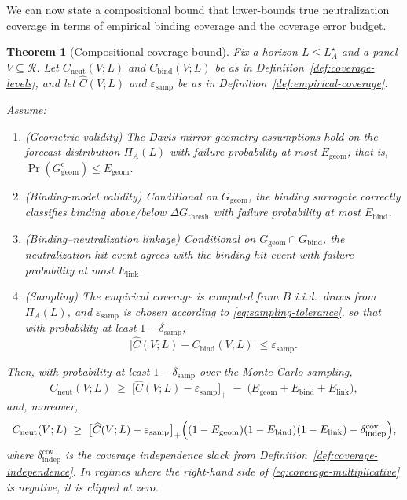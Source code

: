 \documentclass[11pt]{article}
\newtheorem{theorem}{Theorem}
\begin{document}
We can now state a compositional bound that lower-bounds true neutralization coverage in terms
of empirical binding coverage and the coverage error budget.

\begin{theorem}[Compositional coverage bound]
\label{thm:coverage-bound}
Fix a horizon $L \le L_A^\star$ and a panel $V \subseteq \mathcal{R}$. Let
$C_{\mathrm{neut}}(V;L)$ and $C_{\mathrm{bind}}(V;L)$ be as in
Definition~\ref{def:coverage-levels}, and let $\widehat{C}(V;L)$ and
$\varepsilon_{\mathrm{samp}}$ be as in Definition~\ref{def:empirical-coverage}.

Assume:
\begin{enumerate}
\item (\emph{Geometric validity}) The Davis mirror-geometry assumptions hold on the
forecast distribution $\Pi_A(L)$ with failure probability at most $E_{\mathrm{geom}}$; that is,
$\Pr(G_{\mathrm{geom}}^{\mathrm{c}}) \le E_{\mathrm{geom}}$.

\item (\emph{Binding-model validity}) Conditional on $G_{\mathrm{geom}}$, the binding surrogate
correctly classifies binding above/below $\Delta G_{\mathrm{thresh}}$ with failure probability at most
$E_{\mathrm{bind}}$.

\item (\emph{Binding--neutralization linkage}) Conditional on
$G_{\mathrm{geom}} \cap G_{\mathrm{bind}}$, the neutralization hit event agrees with the binding hit
event with failure probability at most $E_{\mathrm{link}}$.

\item (\emph{Sampling}) The empirical coverage is computed from $B$ i.i.d.\ draws from
$\Pi_A(L)$, and $\varepsilon_{\mathrm{samp}}$ is chosen according to
\eqref{eq:sampling-tolerance}, so that with probability at least $1-\delta_{\mathrm{samp}}$,
\[
\bigl|\widehat{C}(V;L) - C_{\mathrm{bind}}(V;L)\bigr| \le \varepsilon_{\mathrm{samp}}.
\]
\end{enumerate}

Then, with probability at least $1-\delta_{\mathrm{samp}}$ over the Monte Carlo sampling,
\begin{equation}
\label{eq:coverage-additive}
C_{\mathrm{neut}}(V;L)
\;\ge\;
\bigl[\widehat{C}(V;L) - \varepsilon_{\mathrm{samp}}\bigr]_+
\;-\;
\bigl(E_{\mathrm{geom}} + E_{\mathrm{bind}} + E_{\mathrm{link}}\bigr),
\end{equation}
and, moreover,
\begin{equation}
\label{eq:coverage-multiplicative}
C_{\mathrm{neut}}(V;L)
\;\ge\;
\bigl[\widehat{C}(V;L) - \varepsilon_{\mathrm{samp}}\bigr]_+
\Bigl(
(1 - E_{\mathrm{geom}})(1 - E_{\mathrm{bind}})(1 - E_{\mathrm{link}})
- \delta_{\mathrm{indep}}^{\mathrm{cov}}
\Bigr),
\end{equation}
where $\delta_{\mathrm{indep}}^{\mathrm{cov}}$ is the coverage independence slack from
Definition~\ref{def:coverage-independence}. In regimes where the right-hand side of
\eqref{eq:coverage-multiplicative} is negative, it is clipped at zero.
\end{theorem}
\end{document}
